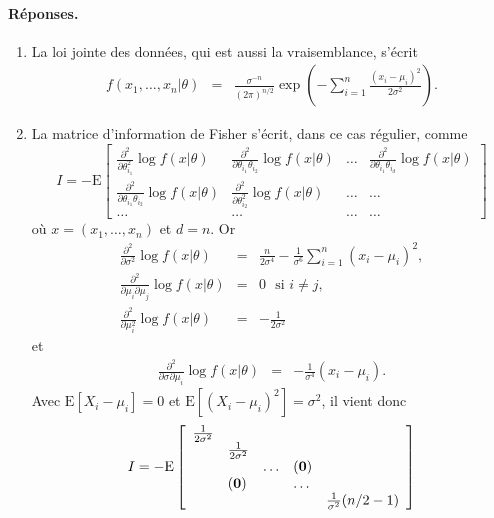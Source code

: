 \documentclass[10pt]{article}
\newcommand{\E}{\mbox{E}}
\newcommand{\1}{\mathbbm{1}}
\begin{document}
\paragraph{\bf Réponses.}
\begin{enumerate}
\item La loi jointe des données, qui est aussi la vraisemblance, s'écrit 
\begin{eqnarray}
f(x_1,\ldots,x_n| \theta) & = & \frac{\sigma^{-n}}{(2\pi)^{n/2}} \exp\left(-\sum\limits_{i=1}^n \frac{(x_i-\mu_i)^2}{2\sigma^2}\right). \label{vrais}
\end{eqnarray}
\item La matrice d'information de Fisher s'écrit, dans ce cas régulier, comme 
$$
I=-\E\left[\begin{array}{llll}
\frac{\partial^2}{\partial \theta^2_{i_1}} \log f(x | \theta) & \frac{\partial^2}{\partial \theta_{i_1}\theta_{i_2}} \log f(x | \theta) & \ldots & \frac{\partial^2}{\partial \theta_{i_1}\theta_{i_d}} \log f(x | \theta) \\
\frac{\partial^2}{\partial \theta_{i_1}\theta_{i_2}} \log f(x | \theta) & \frac{\partial^2}{\partial \theta^2_{i_2}} \log f(x | \theta) & \ldots & \ldots \\
\ldots & \ldots & \ldots & \ldots 
\end{array}\right]
$$
où $x=(x_1,\ldots,x_n)$ et $d=n$. Or
\begin{eqnarray*}
\frac{\partial^2}{\partial \sigma^2} \log f(x | \theta) & = & \frac{n}{2\sigma^4} - \frac{1}{\sigma^6}\sum\limits_{i=1}^n (x_i-\mu_i)^2, \\
\frac{\partial^2}{\partial \mu_i \partial \mu_j} \log f(x | \theta) & = & 0 \ \ \ \text{si $i\neq j$,} \\
\frac{\partial^2}{\partial \mu^2_i} \log f(x | \theta) & = & -\frac{1}{2\sigma^2}
\end{eqnarray*}
et
\begin{eqnarray*}
\frac{\partial^2}{\partial \sigma \partial \mu_i }\log f(x | \theta) & = & -\frac{1}{\sigma^4} (x_i-\mu_i).
\end{eqnarray*}
Avec $\E[X_i-\mu_i]=0$ et $\E[(X_i-\mu_i)^2]=\sigma^2$, il vient donc
$$
I=-\E\left[\begin{array}{lllll}
\frac{1}{2\sigma^2} & \\
&  \frac{1}{2\sigma^2}  & \\
&&  \ldots & {\bf (0)} \\
& {\bf (0)} && \ldots & \\
&&&& \frac{1}{\sigma^2} (n/2-1)
\end{array}\right]
$$
\end{enumerate}
\end{document}
